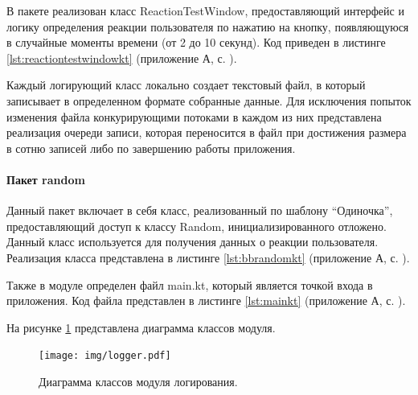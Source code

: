В пакете реализован класс ReactionTestWindow, предоставляющий интерфейс и логику определения реакции пользователя по нажатию на кнопку, появляющуюся в случайные моменты времени (от 2 до 10 секунд). Код приведен в листинге \ref{lst:reactiontestwindowkt} (приложение А, с. \pageref{chp:application-a}).

Каждый логирующий класс локально создает текстовый файл, в который записывает в определенном формате собранные данные. Для исключения попыток изменения файла конкурирующими потоками в каждом из них представлена реализация очереди записи, которая переносится в файл при достижения размера в сотню записей либо по завершению работы приложения.

\paragraph{Пакет random \newline}
Данный пакет включает в себя класс, реализованный по шаблону ``Одиночка'', предоставляющий доступ к классу Random, инициализированного отложено. Данный класс используется для получения данных о реакции пользователя. Реализация класса представлена в листинге \ref{lst:bbrandomkt} (приложение А, с. \pageref{chp:application-a}).

Также в модуле определен файл main.kt, который является точкой входа в приложения. Код файла представлен в листинге \ref{lst:mainkt} (приложение А, с. \pageref{chp:application-a}).

На рисунке \ref{fig:loggingUml} представлена диаграмма классов модуля.
\begin{figure}[H]
	\centering
	\texttt{[image: img/logger.pdf]}
	\caption{Диаграмма классов модуля логирования.}
	\label{fig:loggingUml}
\end{figure}

